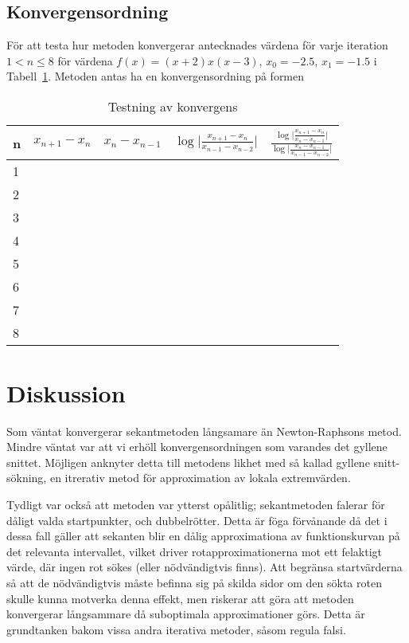 \documentclass{article}
\begin{document}
\subsection{Konvergensordning}
För att testa hur metoden konvergerar antecknades värdena för varje iteration $1 < n \leq 8$ för värdena $f(x)=(x+2) x (x-3)$, $x_0=-2.5$, $x_1=-1.5$ i Tabell~\ref{konvergens}. Metoden antas ha en konvergensordning på formen 

\begin{table}[H]
  \begin{tabu}{l l l l l}
    n & $x_{n+1}-x_n$ & $x_n-x_{n-1}$ & $\log\lvert\frac{x_{n+1}-x_n}{x_{n-1}-x_{n-2}}\rvert$ & $\frac{\log\lvert\frac{x_{n+1}-x_n}{x_n-x_{n-1}}\rvert}{\log\lvert\frac{x_n-x_{n-1}}{x_{n-1}-x_{n-2}}\rvert}$\\
     \\
    2 \\
    3 \\
    4 \\
    5 \\
    6 \\
    7 \\
    8 \\
  \end{tabu}
  \caption{Testning av konvergens}\label{konvergens}
\end{table}

\section{Diskussion}
Som väntat konvergerar sekantmetoden långsamare än Newton-Raphsons metod. Mindre väntat var att vi erhöll konvergensordningen som varandes det gyllene snittet. Möjligen anknyter detta till metodens likhet med så kallad gyllene snitt-sökning, en itrerativ metod för approximation av lokala extremvärden. 

Tydligt var också att metoden var ytterst opålitlig; sekantmetoden falerar för dåligt valda startpunkter, och dubbelrötter. Detta är föga förvånande då det i dessa fall gäller att sekanten blir en dålig approximationa av funktionskurvan på det relevanta intervallet, vilket driver rotapproximationerna mot ett felaktigt värde, där ingen rot sökes (eller nödvändigtvis finns). Att begränsa startvärderna så att de nödvändigtvis måste befinna sig på skilda sidor om den sökta roten skulle kunna motverka denna effekt, men riskerar att göra att metoden konvergerar långsammare då suboptimala approximationer görs. Detta är grundtanken bakom vissa andra iterativa metoder, såsom regula falsi.
\end{document}

